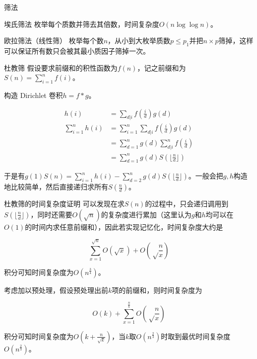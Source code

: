 \documentclass{beamer}
\begin{document}
\begin{frame}{筛法}
	\begin{block}{埃氏筛法}
		枚举每个质数并筛去其倍数，时间复杂度$O(n\log\log n)$。
	\end{block}
	\begin{block}{欧拉筛法（线性筛）}
		枚举每个数$n$，从小到大枚举质数$p \le p_1$并把$n\times p$筛掉，这样可以保证所有数只会被其最小质因子筛掉一次。
	\end{block}
\end{frame}
\begin{frame}{杜教筛}
	假设要求前缀和的积性函数为$f(n)$，记之前缀和为$S(n)=\sum\limits_{i=1}^nf(i)$。
	
	构造 Dirichlet 卷积$h = f * g$。
	
	$$
	\begin{aligned}
		h(i)&=\sum_{d|i}f(\frac{i}{d})g(d)\\
		\sum_{i=1}^nh(i)&=\sum_{i=1}^n\sum_{d|i}f(\frac{i}{d})g(d)\\
		&=\sum_{d=1}^ng(d)\sum_{d|i}^nf(\frac{i}{d})\\
		&=\sum_{d=1}^ng(d)S(\lfloor\frac{n}{d}\rfloor)
	\end{aligned}
	$$
	
	于是有$g(1)S(n)=\sum\limits_{i=1}^nh(i)-\sum\limits_{d=2}^ng(d)S(\lfloor\frac{n}{d}\rfloor)$。一般会把$g, h$构造地比较简单，然后直接递归求所有$S(\frac{n}{d})$。
\end{frame}
\begin{frame}{杜教筛的时间复杂度证明}
	可以发现在求$S(n)$的过程中，只会递归调用到$S(\lfloor\frac{n}{d}\rfloor)$，同时还需要$O(\sqrt n)$的复杂度进行累加（这里认为$g$和$h$均可以在$O(1)$的时间内求任意前缀和），因此若实现记忆化，时间复杂度大约是
	
	$$\sum_{x=1}^{\sqrt n}O\left(\sqrt x\right)+O\left(\sqrt \frac nx\right)$$
	
	积分可知时间复杂度为$O(n^{\frac 34})$。
	
	考虑加以预处理，假设预处理出前$k$项的前缀和，则时间复杂度为
	
	$$O(k)+\sum_{x=1}^{\frac nk}O\left(\sqrt \frac nx\right)$$
	
	积分可知时间复杂度为$O\left(k+\frac{n}{\sqrt k}\right)$，当$k$取$O(n^{\frac 23})$时取到最优时间复杂度$O(n^{\frac 23})$。
\end{frame}
\end{document}
